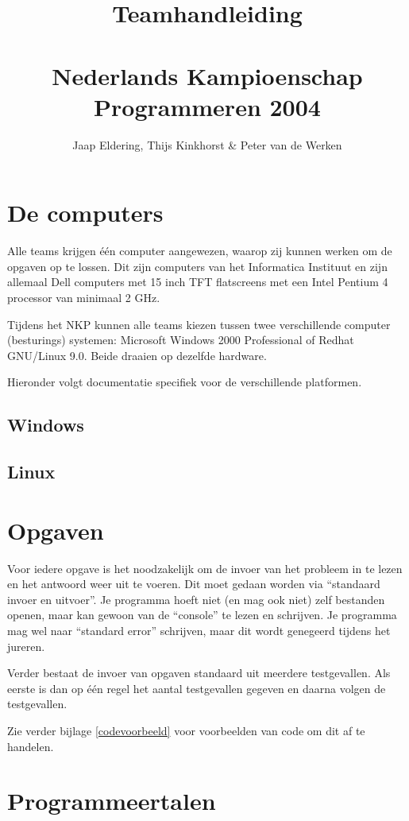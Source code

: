 \documentclass[11pt,titlepage,a4paper]{article}
\title{Teamhandleiding\\~\\Nederlands Kampioenschap Programmeren 2004}
\author{Jaap Eldering, Thijs Kinkhorst \& Peter van de Werken}
\begin{document}
\maketitle

\tableofcontents


\newpage
\section{De computers}

Alle teams krijgen \'e\'en computer aangewezen, waarop zij kunnen
werken om de opgaven op te lossen. Dit zijn computers van het
Informatica Instituut en zijn allemaal Dell computers met 15 inch TFT
flatscreens met een Intel Pentium 4 processor van minimaal 2 GHz.

Tijdens het NKP kunnen alle teams kiezen tussen twee verschillende
computer (besturings) systemen: Microsoft Windows 2000 Professional of
Redhat GNU/Linux 9.0. Beide draaien op dezelfde hardware.

Hieronder volgt documentatie specifiek voor de verschillende platformen.

\subsection{Windows}
\subsection{Linux}


\newpage
\section{Opgaven}

Voor iedere opgave is het noodzakelijk om de invoer van het probleem
in te lezen en het antwoord weer uit te voeren. Dit moet gedaan worden
via ``standaard invoer en uitvoer''. Je programma hoeft niet (en mag
ook niet) zelf bestanden openen, maar kan gewoon van de ``console'' te
lezen en schrijven. Je programma mag wel naar ``standard error''
schrijven, maar dit wordt genegeerd tijdens het jureren.

Verder bestaat de invoer van opgaven standaard uit meerdere
testgevallen. Als eerste is dan op \'e\'en regel het aantal
testgevallen gegeven en daarna volgen de testgevallen.

Zie verder bijlage \ref{codevoorbeeld} voor voorbeelden van code om
dit af te handelen.


\newpage
\section{Programmeertalen}
\end{document}
